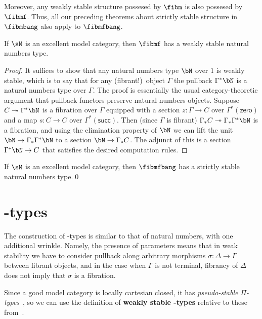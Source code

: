 \documentclass{amsart}
\let\W\iW
\def\zero{\mathsf{zero}}
\def\succ{\mathsf{succ}}
\begin{document}
Moreover, any weakly stable structure possesed by $\fibm$ is also possesed by $\fibmf$.
Thus, all our preceding theorems about strictly stable structure in $\fibmbang$ also apply to $\fibmfbang$.

\begin{thm}\label{thm:nat-stable}
  If $\sM$ is an excellent model category, then $\fibmf$ has a weakly stable natural numbers type.
\end{thm}
\begin{proof}
  It suffices to show that any natural numbers type $\bN$ over $1$ is weakly stable, which is to say that for any (fibrant!)\ object $\Gamma$ the pullback $\Gamma^* \bN$ is a natural numbers type over $\Gamma$.
  The proof is essentially the usual category-theoretic argument that pullback functors preserve natural numbers objects.
  Suppose $C\fib \Gamma^* \bN$ is a fibration over $\Gamma$ equipped with a section $z:\Gamma\to C$ over $\Gamma^*(\zero)$ and a map $s:C\to C$ over $\Gamma^*(\succ)$.
  Then (since $\Gamma$ is fibrant) $\Gamma_* C \fib \Gamma_* \Gamma^* \bN$ is a fibration, and using the elimination property of $\bN$ we can lift the unit $\bN \to \Gamma_* \Gamma^* \bN$ to a section $\bN\to \Gamma_* C$.
  The adjunct of this is a section $\Gamma^* \bN \to C$ that satisfies the desired computation rules.
\end{proof}

\begin{cor}
  If $\sM$ is an excellent model category, then $\fibmfbang$ has a strictly stable natural numbers type.\qed
\end{cor}


\section{\W-types}
\label{sec:w-types}

The construction of \W-types is similar to that of natural numbers, with one additional wrinkle.
Namely, the presence of parameters means that in weak stability we have to consider pullback along arbitrary morphisms $\sigma:\Delta\to\Gamma$ between fibrant objects, and in the case when $\Gamma$ is not terminal, fibrancy of $\Delta$ does not imply that $\sigma$ is a fibration.

Since a good model category is locally cartesian closed, it has \emph{pseudo-stable $\Pi$-types}~\cite[Definition 3.4.2.8]{lw:localuniv}, so we can use the definition of \textbf{weakly stable \W-types} relative to these from~\cite[Definition 3.4.4.9]{lw:localuniv}.
\end{document}
